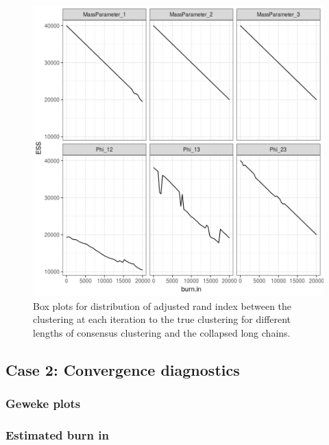 \documentclass[12pt]{article} %
\begin{document}
\newpage

\begin{figure}[h]
	\centering
	\includegraphics[scale=0.65]{Images/Gen_data/Case_1/Esimated_burn_in_plot_10.png}
	\caption{Box plots for distribution of adjusted rand index between the clustering at each iteration to the true clustering for different lengths of consensus clustering and the collapsed long chains.}
	\label{fig:case_1_esimated_burn_in_plot_10}
\end{figure}

\newpage

\subsection{Case 2: Convergence diagnostics}

\subsubsection{Geweke plots}

\subsubsection{Estimated burn in}
\end{document}
